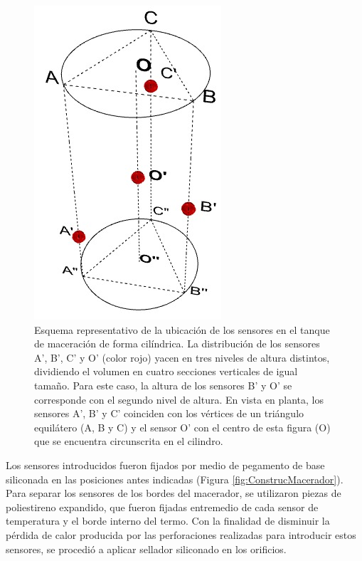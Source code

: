         \begin{figure}[h]
            \centering
            \includegraphics[scale=0.5]{Pruebas/UbicacionSensoresEnTanque-04.jpeg}
            \caption{Esquema representativo de la ubicación de los sensores en el tanque de maceración de forma cilíndrica. La distribución de los sensores A', B', C' y O' (color rojo) yacen en tres niveles de altura distintos, dividiendo el volumen en cuatro secciones verticales de igual tamaño. Para este caso, la altura de los sensores B' y O' se corresponde con el segundo nivel de altura. En vista en planta, los sensores A', B' y C' coinciden con los vértices de un triángulo equilátero (A, B y C) y el sensor O' con el centro de esta figura (O) que se encuentra circunscrita en el cilindro.}
            \label{fig:SensoresEnTanque}
        \end{figure}
        
        \par Los sensores introducidos fueron fijados por medio de pegamento de base siliconada en las posiciones antes indicadas (Figura \ref{fig:ConstrucMacerador}). Para separar los sensores de los bordes del macerador, se utilizaron piezas de poliestireno expandido, que fueron fijadas entremedio de cada sensor de temperatura y el borde interno del termo.
        Con la finalidad de disminuir la pérdida de calor producida por las perforaciones realizadas para introducir estos sensores, se procedió a aplicar sellador siliconado  en los orificios.
        
